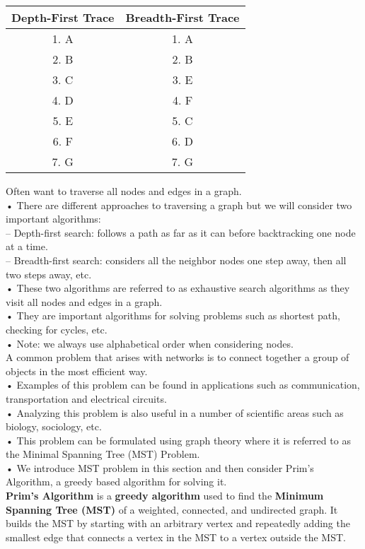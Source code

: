 \documentclass[a4paper,12pt]{article}
\begin{document}
\begin{center}
\begin{tabular}{|c|c|}
\hline
\textbf{Depth-First Trace} & \textbf{Breadth-First Trace} \\
\hline
1. A & 1. A \\
2. B & 2. B \\
3. C & 3. E \\
4. D & 4. F \\
5. E & 5. C \\
6. F & 6. D \\
7. G & 7. G \\
\hline
\end{tabular}
\end{center}


Often want to traverse all nodes and edges in a graph.\\
• There are different approaches to traversing a graph but we
will consider two important algorithms:\\
– Depth-first search: follows a path as far as it can before
backtracking one node at a time.\\
– Breadth-first search: considers all the neighbor nodes
one step away, then all two steps away, etc.\\
• These two algorithms are referred to as exhaustive search
algorithms as they visit all nodes and edges in a graph.\\
• They are important algorithms for solving problems such as
shortest path, checking for cycles, etc.\\
• Note: we always use alphabetical order when considering
nodes.\\

A common problem that arises with networks is to connect
together a group of objects in the most efficient way.\\
• Examples of this problem can be found in applications such
as communication, transportation and electrical circuits.\\
• Analyzing this problem is also useful in a number of
scientific areas such as biology, sociology, etc.\\
• This problem can be formulated using graph theory where it
is referred to as the Minimal Spanning Tree (MST)
Problem.\\
• We introduce MST problem in this section and then
consider Prim’s Algorithm, a greedy based algorithm for
solving it.\\

\textbf{Prim's Algorithm} is a \textbf{greedy algorithm} used to find the \textbf{Minimum Spanning Tree (MST)} of a weighted, connected, and undirected graph. It builds the MST by starting with an arbitrary vertex and repeatedly adding the smallest edge that connects a vertex in the MST to a vertex outside the MST.
\end{document}
